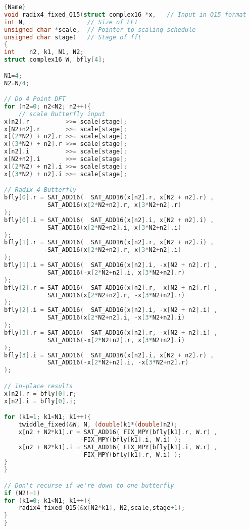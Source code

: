\documentclass[a4paper]{article}
\begin{document}
\begin{lstlisting}[caption=code 5,frame=tlrb, language=C]{Name}
void radix4_fixed_Q15(struct complex16 *x,   // Input in Q15 format
int N,                 // Size of FFT
unsigned char *scale,  // Pointer to scaling schedule
unsigned char stage)   // Stage of fft
{
int    n2, k1, N1, N2;
struct complex16 W, bfly[4];

N1=4;
N2=N/4;

// Do 4 Point DFT
for (n2=0; n2<N2; n2++){
    // scale Butterfly input
x[n2].r          >>= scale[stage];
x[N2+n2].r       >>= scale[stage];
x[(2*N2) + n2].r >>= scale[stage];
x[(3*N2) + n2].r >>= scale[stage];
x[n2].i          >>= scale[stage];
x[N2+n2].i       >>= scale[stage];
x[(2*N2) + n2].i >>= scale[stage];
x[(3*N2) + n2].i >>= scale[stage];

// Radix 4 Butterfly
bfly[0].r = SAT_ADD16(  SAT_ADD16(x[n2].r, x[N2 + n2].r) ,
            SAT_ADD16(x[2*N2+n2].r, x[3*N2+n2].r)
);
bfly[0].i = SAT_ADD16(  SAT_ADD16(x[n2].i, x[N2 + n2].i) ,
            SAT_ADD16(x[2*N2+n2].i, x[3*N2+n2].i)
);
bfly[1].r = SAT_ADD16(  SAT_ADD16(x[n2].r, x[N2 + n2].i) ,
           -SAT_ADD16(x[2*N2+n2].r, x[3*N2+n2].i)
);
bfly[1].i = SAT_ADD16(  SAT_ADD16(x[n2].i, -x[N2 + n2].r) ,
            SAT_ADD16(-x[2*N2+n2].i, x[3*N2+n2].r)
);
bfly[2].r = SAT_ADD16(  SAT_ADD16(x[n2].r, -x[N2 + n2].r) ,
            SAT_ADD16(x[2*N2+n2].r, -x[3*N2+n2].r)
);
bfly[2].i = SAT_ADD16(  SAT_ADD16(x[n2].i, -x[N2 + n2].i) ,
            SAT_ADD16(x[2*N2+n2].i, -x[3*N2+n2].i)
);
bfly[3].r = SAT_ADD16(  SAT_ADD16(x[n2].r, -x[N2 + n2].i) ,
            SAT_ADD16(-x[2*N2+n2].r, x[3*N2+n2].i)
);
bfly[3].i = SAT_ADD16(  SAT_ADD16(x[n2].i, x[N2 + n2].r) ,
            SAT_ADD16(-x[2*N2+n2].i, -x[3*N2+n2].r)
);

// In-place results
x[n2].r = bfly[0].r;
x[n2].i = bfly[0].i;

for (k1=1; k1<N1; k1++){
    twiddle_fixed(&W, N, (double)k1*(double)n2);
    x[n2 + N2*k1].r = SAT_ADD16( FIX_MPY(bfly[k1].r, W.r) ,
                     -FIX_MPY(bfly[k1].i, W.i) );
    x[n2 + N2*k1].i = SAT_ADD16( FIX_MPY(bfly[k1].i, W.r) ,
                      FIX_MPY(bfly[k1].r, W.i) );
}
}

// Don't recurse if we're down to one butterfly
if (N2!=1)
for (k1=0; k1<N1; k1++){
    radix4_fixed_Q15(&x[N2*k1], N2,scale,stage+1);
}
}
\end{lstlisting}



\end{document}
